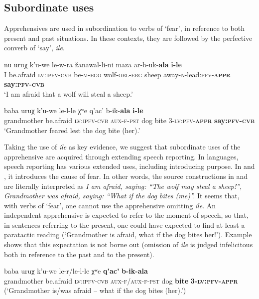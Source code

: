 \documentclass[output=paper,colorlinks,citecolor=brown]{langscibook}
\begin{document}
\subsection{Subordinate uses}
\label{subsec:Msubordinate}
 
Apprehensives are used in subordination to verbs of `fear', in reference to both present  and past  situations. In these contexts, they are followed by the perfective converb of `say', \textit{ile}.


\ea \label{ex:DD41}
\gll nu uruχ k'u-we le-w-ra žanawal-li-ni maza ar-b-uk-\textbf{ala} \textbf{i-le} \\
I be.afraid \textsc{lv:ipfv-cvb} be-\textsc{m-ego} wolf-\textsc{obl-erg} sheep away-\textsc{n}-lead:\textsc{pfv-\textbf{appr}} \textbf{say:\textsc{pfv-cvb}} \\
\glt `I am afraid that a wolf will steal a sheep.'
\z

\ea \label{ex:DD42}
\gll baba uruχ k'u-we le-l-le χʷe {q'ac'} b-ik-\textbf{ala} \textbf{i-le} \\
grandmother be.afraid \textsc{lv:ipfv-cvb} \textsc{aux-f-pst} dog {bite} \textsc{3-lv:pfv-\textbf{appr}} \textbf{say:\textsc{pfv-cvb}} \\
\glt `Grandmother feared lest the dog bite (her).'
\z

 Taking the use of \textit{ile} as key evidence, we suggest that subordinate uses of the apprehensive are acquired through extending speech reporting. In  languages, speech reporting has various extended uses, including introducing purpose. In  and , it introduces the cause of fear. In other words, the source constructions in  and  are literally interpreted as \textit{I am afraid, saying: ``The wolf may steal a sheep!''}, \textit{Grandmother was afraid, saying: ``What if the dog bites (me)''.} It seems that, with verbs of `fear', one cannot use the apprehensive omitting \textit{ile}. An independent apprehensive is expected to refer to the moment of speech, so that, in sentences referring to the present, one could have expected to find at least a paratactic reading (`Grandmother is afraid, what if the dog bites her!'). Example  shows that this expectation is not borne out (omission of \textit{ile} is judged infelicitous both in reference to the past and to the present).
 

\ea \label{ex:DD43}
\gll *baba uruχ k'u-we le-r\textup{/}le-l-le χʷe \textbf{q'ac'} \textbf{b-ik-ala} \\
grandmother be.afraid \textsc{lv:ipfv-cvb} \textsc{aux-f}/\textsc{aux-f-pst} dog \textbf{bite} \textbf{\textsc{3-lv:pfv-appr}} \\
\glt (`Grandmother is/was afraid -- what if the dog bites (her).')
\z
\end{document}
